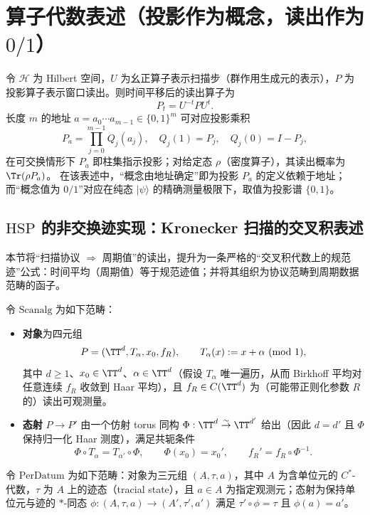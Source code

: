 \section{算子代数表述（投影作为概念，读出作为 \texorpdfstring{$0/1$}{0/1}）}
\label{app:op-algebra}

令 $\mathcal{H}$ 为 Hilbert 空间，$U$ 为幺正算子表示扫描步（群作用生成元的表示），$P$ 为投影算子表示窗口读出。则时间平移后的读出算子为
\[
P_t=U^{-t}PU^t.
\]
长度 $m$ 的地址 $a=a_0\cdots a_{m-1}\in\{0,1\}^m$ 可对应投影乘积
\[
P_a=\prod_{j=0}^{m-1} Q_{j}(a_j),\quad
Q_{j}(1)=P_j,\quad Q_{j}(0)=I-P_j,
\]
在可交换情形下 $P_a$ 即柱集指示投影；对给定态 $\rho$（密度算子），其读出概率为 $\Tr(\rho P_a)$。
在该表述中，“概念由地址确定”即为投影 $P_a$ 的定义依赖于地址；而“概念值为 $0/1$”对应在纯态 $\lvert\psi\rangle$ 的精确测量极限下，取值为投影谱 $\{0,1\}$。

\subsection{\texorpdfstring{$\mathrm{HSP}$}{HSP} 的非交换迹实现：Kronecker 扫描的交叉积表述}\label{app:op-algebra-hsp-trace}

本节将“扫描协议 \(\Rightarrow\) 周期值”的读出，提升为一条严格的“交叉积代数上的规范迹”公式：时间平均（周期值）等于规范迹值；并将其组织为协议范畴到周期数据范畴的函子。

\begin{definition}\label{def:scanalg}
令 \(\mathrm{Scanalg}\) 为如下范畴：
\begin{itemize}
  \item \textbf{对象}为四元组
  \[
  P=(\TT^d,T_\alpha,x_0,f_R),
  \qquad
  T_\alpha(x):=x+\alpha\ (\mathrm{mod}\ 1),
  \]
  其中 \(d\ge 1\)、\(x_0\in\TT^d\)、\(\alpha\in\TT^d\)（假设 \(T_\alpha\) 唯一遍历，从而 Birkhoff 平均对任意连续 \(f_R\) 收敛到 Haar 平均），且 \(f_R\in C(\TT^d)\) 为（可能带正则化参数 \(R\) 的）读出可观测量。
  \item \textbf{态射} \(P\to P'\) 由一个仿射 torus 同构 \(\Phi:\TT^d\overset{\sim}{\to}\TT^{d'}\) 给出（因此 \(d=d'\) 且 \(\Phi\) 保持归一化 Haar 测度），满足共轭条件
  \[
  \Phi\circ T_\alpha = T_{\alpha'}\circ \Phi,\qquad \Phi(x_0)=x_0',\qquad f_R'=f_R\circ \Phi^{-1}.
  \]
\end{itemize}
\end{definition}

\begin{definition}\label{def:perdatum}
令 \(\mathrm{PerDatum}\) 为如下范畴：对象为三元组 \((A,\tau,a)\)，其中 \(A\) 为含单位元的 \(C^\ast\)-代数，\(\tau\) 为 \(A\) 上的迹态（tracial state），且 \(a\in A\) 为指定观测元；态射为保持单位元与迹的 \(\ast\)-同态 \(\phi:(A,\tau,a)\to(A',\tau',a')\) 满足 \(\tau' \circ \phi=\tau\) 且 \(\phi(a)=a'\)。
\end{definition}

